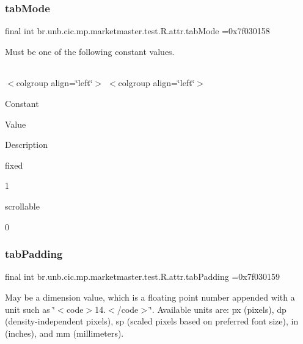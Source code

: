\subsubsection{\texorpdfstring{tab\+Mode}{tabMode}}
{\footnotesize\ttfamily final int br.\+unb.\+cic.\+mp.\+marketmaster.\+test.\+R.\+attr.\+tab\+Mode =0x7f030158\hspace{0.3cm}{\ttfamily [static]}}

Must be one of the following constant values.

\tabulinesep=1mm
\begin{longtabu} spread 0pt [c]{*{0}{|X[-1]}|}
\hline
\end{longtabu}
$<$colgroup align=\char`\"{}left\char`\"{}$>$ $<$colgroup align=\char`\"{}left\char`\"{}$>$ 

Constant

Value

Description 

fixed

1

scrollable

0\mbox{\label{classbr_1_1unb_1_1cic_1_1mp_1_1marketmaster_1_1test_1_1R_1_1attr_a591d0667d3293869120d21fae5a88c8f}} 
\subsubsection{\texorpdfstring{tab\+Padding}{tabPadding}}
{\footnotesize\ttfamily final int br.\+unb.\+cic.\+mp.\+marketmaster.\+test.\+R.\+attr.\+tab\+Padding =0x7f030159\hspace{0.3cm}{\ttfamily [static]}}

May be a dimension value, which is a floating point number appended with a unit such as \char`\"{}$<$code$>$14.\+5sp$<$/code$>$\char`\"{}. Available units are\+: px (pixels), dp (density-\/independent pixels), sp (scaled pixels based on preferred font size), in (inches), and mm (millimeters). \mbox{\label{classbr_1_1unb_1_1cic_1_1mp_1_1marketmaster_1_1test_1_1R_1_1attr_ac1aa4e0fed552a4aee00d17e410a6829}} 
